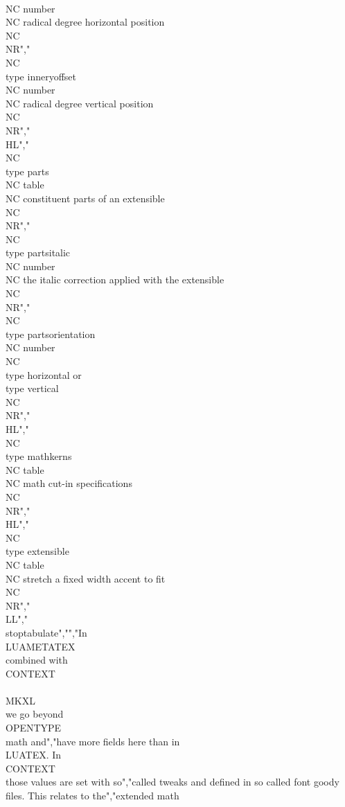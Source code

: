    \\NC number  \\NC radical degree horizontal position \\NC \\NR","\\NC \\type {inneryoffset}     \\NC number  \\NC radical degree vertical position   \\NC \\NR","\\HL","\\NC \\type {parts}            \\NC table   \\NC constituent parts of an extensible                \\NC \\NR","\\NC \\type {partsitalic}      \\NC number  \\NC the italic correction applied with the extensible \\NC \\NR","\\NC \\type {partsorientation} \\NC number  \\NC \\type {horizontal} or \\type {vertical}            \\NC \\NR","\\HL","\\NC \\type {mathkerns}        \\NC table   \\NC math cut-in specifications \\NC \\NR","\\HL","\\NC \\type {extensible}       \\NC table   \\NC stretch a fixed width accent to fit \\NC \\NR","\\LL","\\stoptabulate","","In \\LUAMETATEX\\ combined with \\CONTEXT\\ \\MKXL\\ we go beyond \\OPENTYPE\\ math and","have more fields here than in \\LUATEX. In \\CONTEXT\\ those values are set with so","called tweaks and defined in so called font goody files. This relates to the","extended math 
